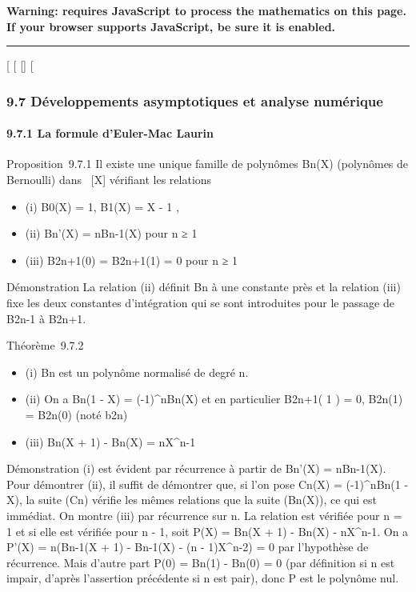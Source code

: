 \textbf{Warning: 
requires JavaScript to process the mathematics on this page.\\ If your
browser supports JavaScript, be sure it is enabled.}

\begin{center}\rule{3in}{0.4pt}\end{center}

{[}
{[}
{[}{]}
{[}

\subsubsection{9.7 Développements asymptotiques et analyse numérique}

\paragraph{9.7.1 La formule d'Euler-Mac Laurin}

Proposition~9.7.1 Il existe une unique famille de polynômes
Bn(X) (polynômes de Bernoulli) dans ~{[}X{]} vérifiant les
relations

\begin{itemize}
\itemsep1pt\parskip0pt
\item
  (i) B0(X) = 1, B1(X) = X - 1
   ,
\item
  (ii) Bn'(X) = nBn-1(X) pour n ≥ 1
\item
  (iii) B2n+1(0) = B2n+1(1) = 0 pour n ≥ 1
\end{itemize}

Démonstration La relation (ii) définit Bn à une constante près
et la relation (iii) fixe les deux constantes d'intégration qui se sont
introduites pour le passage de B2n-1 à B2n+1.

Théorème~9.7.2

\begin{itemize}
\itemsep1pt\parskip0pt
\item
  (i) Bn est un polynôme normalisé de degré n.
\item
  (ii) On a Bn(1 - X) = (-1)^nBn(X) et en
  particulier B2n+1( 1  ) = 0,
  B2n(1) = B2n(0) (noté b2n)
\item
  (iii) Bn(X + 1) - Bn(X) = nX^n-1
\end{itemize}

Démonstration (i) est évident par récurrence à partir de
Bn'(X) = nBn-1(X). Pour démontrer (ii), il suffit de
démontrer que, si l'on pose Cn(X) =
(-1)^nBn(1 - X), la suite (Cn) vérifie
les mêmes relations que la suite (Bn(X)), ce qui est immédiat.
On montre (iii) par récurrence sur n. La relation est vérifiée pour n =
1 et si elle est vérifiée pour n - 1, soit P(X) = Bn(X + 1) -
Bn(X) - nX^n-1. On a P'(X) = n(Bn-1(X +
1) - Bn-1(X) - (n - 1)X^n-2) = 0 par l'hypothèse de
récurrence. Mais d'autre part P(0) = Bn(1) - Bn(0) =
0 (par définition si n est impair, d'après l'assertion précédente si n
est pair), donc P est le polynôme nul.

